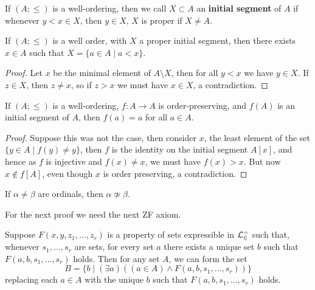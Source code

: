 \documentclass{article}
\begin{document}
\begin{definition}
    If $(A;\leq)$ is a well-ordering, then we call $X\subset A$ an \textbf{initial segment} of $A$ if whenever $y<x\in X$, then $y\in X$, $X$ is proper if $X\neq A$.
\end{definition}

\begin{lemma}
    If $(A;\leq)$ is a well order, with $X$ a proper initial segment, then there exists $x\in A$ such that $X = \{a\in A \mid a < x\}$.
    \begin{proof}
        Let $x$ be the minimal element of $A\setminus X$, then for all $y < x$ we have $y\in X$. If $z\in X$, then $z\neq x$, so if $z > x$ we must have $x\in X$, a contradiction.
    \end{proof}
\end{lemma}

\begin{lemma}
    If $(A;\leq)$ is a well-ordering, $f:A\rightarrow A$ is order-preserving, and $f(A)$ is an initial segment of $A$, then $f(a) = a$ for all $a\in A$.
    \begin{proof}
        Suppose this was not the case, then consider $x$, the least element of the set $\{y \in A \mid f(y) \neq y\}$, then $f$ is the identity on the initial segment $A[x]$, and hence as $f$ is injective and $f(x)\neq x$, we must have $f(x)>x$. But now $x\not\in f[A]$, even though $x$ is order preserving, a contradiction.
    \end{proof}
\end{lemma}

\begin{corollary}
    If $\alpha\neq\beta$ are ordinals, then $\alpha\not\simeq \beta$.
\end{corollary}

For the next proof we need the next ZF axiom.

\begin{axiom}[Replacement]
    Suppose $F(x,y,z_1,\ldots, z_r)$ is a property of sets expressible in $\mathcal{L}^=_\in$ such that, whenever $s_1,\ldots, s_r$ are sets, for every set $a$ there exists a unique set $b$ such that $F(a,b,s_1,\ldots,s_r)$ holds. Then for any set $A$, we can form the set \[
    B = \{b \mid (\exists a)((a\in A) \wedge F(a,b,s_1,\ldots, s_r))\}
    \] replacing each $a\in A$ with the unique $b$ such that $F(a,b,s_1,\ldots, s_r)$ holds.
\end{axiom}
\end{document}
